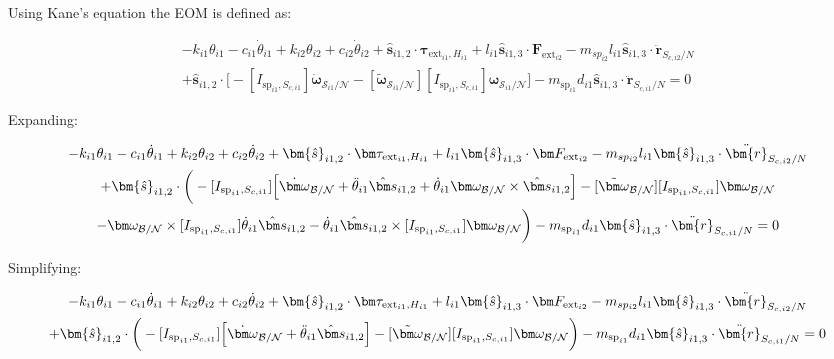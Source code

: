 Using Kane's equation the EOM is defined as:

\begin{multline}
	-k_{i1} \theta_{i1} - c_{i1} \dot{\theta}_{i1} + k_{i2} \theta_{i2} + c_{i2} \dot{\theta}_{i2} + \bm{\hat{s}}_{i1,2} \cdot \bm \tau_{\text{ext}_{i1},H_{i1}}  + l_{i1} \bm{\hat{s}}_{i1,3} \cdot \bm F_{\text{ext}_{i2}}  - m_{sp_{i2}} l_{i1} \bm{\hat{s}}_{i1,3} \cdot \ddot{\bm{r}}_{S_{c,i2}/N} \\
	+ \bm{\hat{s}}_{i1,2} \cdot \Big[-[I_{\text{sp}_{i1},S_{c,i1}}] \dot{\bm\omega}_{\mathcal{S}_{i1}/\mathcal{N}}  -[\tilde{\bm \omega}_{\mathcal{S}_{i1}/\mathcal{N}}] [I_{\text{sp}_{i1},S_{c,i1}}] \bm \omega_{\mathcal{S}_{i1}/\mathcal{N}} \Big] -m_{\text{sp}_{i1}} d_{i1} \bm{\hat{s}}_{i1,3} \cdot \ddot{\bm{r}}_{S_{c,i1}/N} = 0
\end{multline}

Expanding:

\begin{multline}
	-k_{i1} \theta_{i1} - c_{i1} \dot{\theta}_{i1} + k_{i2} \theta_{i2} + c_{i2} \dot{\theta}_{i2} + \bm{\hat{s}}_{i1,2} \cdot \bm \tau_{\text{ext}_{i1},H_{i1}}  + l_{i1} \bm{\hat{s}}_{i1,3} \cdot \bm F_{\text{ext}_{i2}}  - m_{sp_{i2}} l_{i1} \bm{\hat{s}}_{i1,3} \cdot \ddot{\bm{r}}_{S_{c,i2}/N} \\
	+ \bm{\hat{s}}_{i1,2} \cdot \bigg(-[I_{\text{sp}_{i1},S_{c,i1}}] \Big[\dot{\bm \omega}_{\cal{B/N}} + \ddot{\theta}_{i1} \hat{\bm s}_{i1,2} + \dot{\theta}_{i1} \bm \omega_{\cal{B/N}} \times \hat{\bm s}_{i1,2}\Big]
	-[\tilde{\bm \omega}_{\cal{B/N}}] [I_{\text{sp}_{i1},S_{c,i1}}] \bm \omega_{\cal{B/N}}\\
	-\bm \omega_{\cal{B/N}} \times [I_{\text{sp}_{i1},S_{c,i1}}] \dot{\theta}_{i1} \hat{\bm s}_{i1,2} -\dot{\theta}_{i1} \hat{\bm s}_{i1,2} \times [I_{\text{sp}_{i1},S_{c,i1}}] \bm \omega_{\cal{B/N}}\bigg) -m_{\text{sp}_{i1}} d_{i1} \bm{\hat{s}}_{i1,3} \cdot \ddot{\bm{r}}_{S_{c,i1}/N} = 0
\end{multline}

Simplifying:

\begin{multline}
	-k_{i1} \theta_{i1} - c_{i1} \dot{\theta}_{i1} + k_{i2} \theta_{i2} + c_{i2} \dot{\theta}_{i2} + \bm{\hat{s}}_{i1,2} \cdot \bm \tau_{\text{ext}_{i1},H_{i1}}  + l_{i1} \bm{\hat{s}}_{i1,3} \cdot \bm F_{\text{ext}_{i2}}  - m_{sp_{i2}} l_{i1} \bm{\hat{s}}_{i1,3} \cdot \ddot{\bm{r}}_{S_{c,i2}/N} \\
	+ \bm{\hat{s}}_{i1,2} \cdot \bigg(-[I_{\text{sp}_{i1},S_{c,i1}}] \Big[\dot{\bm \omega}_{\cal{B/N}} + \ddot{\theta}_{i1} \hat{\bm s}_{i1,2}\Big]
	-[\tilde{\bm \omega}_{\cal{B/N}}] [I_{\text{sp}_{i1},S_{c,i1}}] \bm \omega_{\cal{B/N}} \bigg) -m_{\text{sp}_{i1}} d_{i1} \bm{\hat{s}}_{i1,3} \cdot \ddot{\bm{r}}_{S_{c,i1}/N} = 0
\end{multline}

